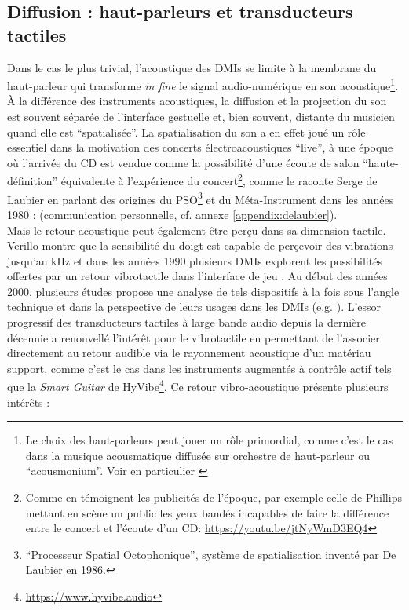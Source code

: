 \subsection{Diffusion : haut-parleurs et transducteurs tactiles}

\noindent Dans le cas le plus trivial, l'acoustique des \glspl{DMI} se limite à la membrane du haut-parleur qui transforme \textit{in fine} le signal audio-numérique en son acoustique\footnote{Le choix des haut-parleurs peut jouer un rôle primordial, comme c'est le cas dans la musique acousmatique diffusée sur orchestre de haut-parleur ou ``acousmonium''. Voir en particulier \cite{mooney_sound_2006}}. À la différence des instruments acoustiques, la diffusion et la projection du son est souvent séparée de l'interface gestuelle et, bien souvent, distante du musicien quand elle est ``spatialisée''. La spatialisation du son a en effet joué un rôle essentiel dans la motivation des concerts électroacoustiques ``live'', à une époque où l'arrivée du \gls{CD} est vendue comme la possibilité d'une écoute de salon ``haute-définition'' équivalente à l'expérience du concert\footnote{Comme en témoignent les publicités de l'époque, par exemple celle de Phillips mettant en scène un public les yeux bandés incapables de faire la différence entre le concert et l'écoute d'un \gls{CD}: \url{https://youtu.be/jtNyWmD3EQ4}}, comme le raconte Serge de Laubier en parlant des origines du PSO\footnote{``Processeur Spatial Octophonique'', système de spatialisation inventé par De Laubier en 1986.} et du Méta-Instrument dans les années 1980 :  (communication personnelle, cf. annexe \ref{appendix:delaubier}).\\
\indent Mais le retour acoustique peut également être perçu dans sa dimension tactile. Verillo montre que la sensibilité du doigt est capable de perçevoir des vibrations jusqu'au kHz \cite{verillo_vibration_1991} et dans les années 1990 plusieurs \glspl{DMI} explorent les possibilités offertes par un retour vibrotactile dans l'interface de jeu \cite{chafe_tactile_1993, bongers_tactual_1998}. Au début des années 2000, plusieurs études propose une analyse de tels dispositifs à la fois sous l'angle technique et dans la perspective de leurs usages dans les \glspl{DMI} (e.g. \cite{rovan_typology_2000, marshall_vibrotactile_2006, birnbaum_towards_2005}). L'essor progressif des transducteurs tactiles à large bande audio depuis la dernière décennie a renouvellé l'intérêt pour le vibrotactile en permettant de l'associer directement au retour audible via le rayonnement acoustique d'un matériau support, comme c'est le cas dans les instruments augmentés à contrôle actif tels que la \textit{Smart Guitar} de HyVibe\footnote{\label{fn-hyvibe}\url{https://www.hyvibe.audio}}. Ce retour vibro-acoustique présente plusieurs intérêts :
